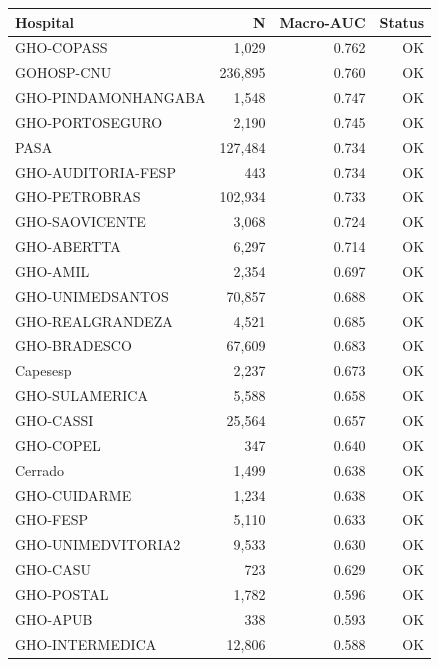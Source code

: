 \documentclass[11pt,a4paper]{article}
\begin{document}
\begin{center}
\begin{tabular}{lrrr}
\toprule
Hospital & N & Macro-AUC & Status \\
\midrule
\rowcolor{green!20}GHO-COPASS & 1,029 & 0.762 & OK \\
\rowcolor{green!20}GOHOSP-CNU & 236,895 & 0.760 & OK \\
\rowcolor{yellow!20}GHO-PINDAMONHANGABA & 1,548 & 0.747 & OK \\
\rowcolor{yellow!20}GHO-PORTOSEGURO & 2,190 & 0.745 & OK \\
\rowcolor{yellow!20}PASA & 127,484 & 0.734 & OK \\
\rowcolor{yellow!20}GHO-AUDITORIA-FESP & 443 & 0.734 & OK \\
\rowcolor{yellow!20}GHO-PETROBRAS & 102,934 & 0.733 & OK \\
\rowcolor{yellow!20}GHO-SAOVICENTE & 3,068 & 0.724 & OK \\
\rowcolor{yellow!20}GHO-ABERTTA & 6,297 & 0.714 & OK \\
\rowcolor{yellow!20}GHO-AMIL & 2,354 & 0.697 & OK \\
\rowcolor{yellow!20}GHO-UNIMEDSANTOS & 70,857 & 0.688 & OK \\
\rowcolor{yellow!20}GHO-REALGRANDEZA & 4,521 & 0.685 & OK \\
\rowcolor{yellow!20}GHO-BRADESCO & 67,609 & 0.683 & OK \\
\rowcolor{yellow!20}Capesesp & 2,237 & 0.673 & OK \\
\rowcolor{yellow!20}GHO-SULAMERICA & 5,588 & 0.658 & OK \\
\rowcolor{yellow!20}GHO-CASSI & 25,564 & 0.657 & OK \\
\rowcolor{yellow!20}GHO-COPEL & 347 & 0.640 & OK \\
\rowcolor{yellow!20}Cerrado & 1,499 & 0.638 & OK \\
\rowcolor{yellow!20}GHO-CUIDARME & 1,234 & 0.638 & OK \\
\rowcolor{yellow!20}GHO-FESP & 5,110 & 0.633 & OK \\
\rowcolor{yellow!20}GHO-UNIMEDVITORIA2 & 9,533 & 0.630 & OK \\
\rowcolor{yellow!20}GHO-CASU & 723 & 0.629 & OK \\
\rowcolor{red!20}GHO-POSTAL & 1,782 & 0.596 & OK \\
\rowcolor{red!20}GHO-APUB & 338 & 0.593 & OK \\
\rowcolor{red!20}GHO-INTERMEDICA & 12,806 & 0.588 & OK \\

\end{tabular}
\end{center}
\end{document}

